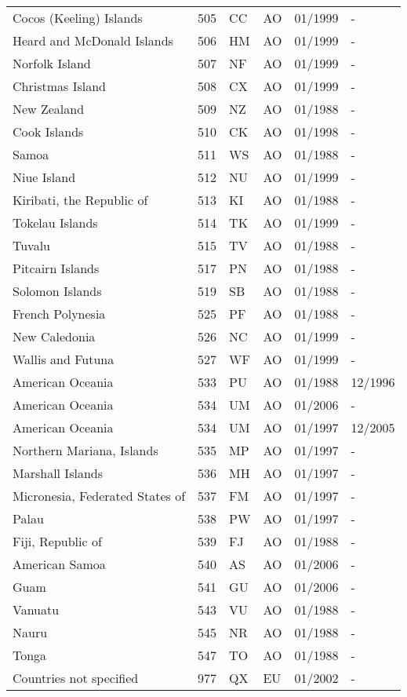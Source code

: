 \begin{small}
\begin{longtable}{p{4.3cm}p{1.5cm}p{1.5cm}p{1cm}p{2cm}p{2cm}}
Cocos (Keeling) Islands	&	505	&	CC	&	AO	&	01/1999	&	-	\\
Heard and McDonald Islands	&	506	&	HM	&	AO	&	01/1999	&	-	\\
Norfolk Island	&	507	&	NF	&	AO	&	01/1999	&	-	\\
Christmas Island	&	508	&	CX	&	AO	&	01/1999	&	-	\\
New Zealand	&	509	&	NZ	&	AO	&	01/1988	&	-	\\
Cook Islands	&	510	&	CK	&	AO	&	01/1998	&	-	\\
Samoa	&	511	&	WS	&	AO	&	01/1988	&	-	\\
Niue Island	&	512	&	NU	&	AO	&	01/1999	&	-	\\
Kiribati, the Republic of	&	513	&	KI	&	AO	&	01/1988	&	-	\\
Tokelau Islands	&	514	&	TK	&	AO	&	01/1999	&	-	\\
Tuvalu	&	515	&	TV	&	AO	&	01/1988	&	-	\\
Pitcairn Islands	&	517	&	PN	&	AO	&	01/1988	&	-	\\
Solomon Islands	&	519	&	SB	&	AO	&	01/1988	&	-	\\
French Polynesia	&	525	&	PF	&	AO	&	01/1988	&	-	\\
New Caledonia	&	526	&	NC	&	AO	&	01/1999	&	-	\\
Wallis and Futuna	&	527	&	WF	&	AO	&	01/1999	&	-	\\
American Oceania	&	533	&	PU	&	AO	&	01/1988	&	12/1996	\\
American Oceania	&	534	&	UM	&	AO	&	01/2006	&	-	\\
American Oceania	&	534	&	UM	&	AO	&	01/1997	&	12/2005	\\
Northern Mariana, Islands	&	535	&	MP	&	AO	&	01/1997	&	-	\\
Marshall Islands	&	536	&	MH	&	AO	&	01/1997	&	-	\\
Micronesia, Federated States of	&	537	&	FM	&	AO	&	01/1997	&	-	\\
Palau	&	538	&	PW	&	AO	&	01/1997	&	-	\\
Fiji, Republic of	&	539	&	FJ	&	AO	&	01/1988	&	-	\\
American Samoa	&	540	&	AS	&	AO	&	01/2006	&	-	\\
Guam	&	541	&	GU	&	AO	&	01/2006	&	-	\\
Vanuatu	&	543	&	VU	&	AO	&	01/1988	&	-	\\
Nauru	&	545	&	NR	&	AO	&	01/1988	&	-	\\
Tonga	&	547	&	TO	&	AO	&	01/1988	&	-	\\
Countries not specified	&	977	&	QX	&	EU	&	01/2002	&	-	\\
\end{longtable}
\end{small}